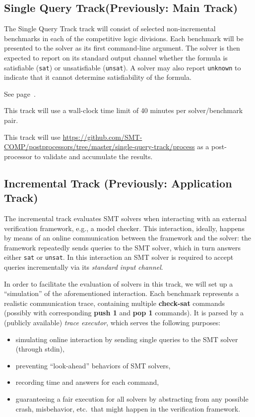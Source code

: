 \documentclass[12pt]{article}
\newcommand{\akey}[1]{\textbf{#1}\xspace}
\newcommand{\maintrack}{Single Query Track\xspace}
\begin{document}
\subsection{\maintrack (Previously: Main Track)}
\label{sec:exec:single}

The \maintrack track will consist of selected non-incremental benchmarks in
each of the competitive logic divisions.  Each benchmark will be presented to
the solver as its first command-line argument.  The solver is then expected to
report on its standard output channel whether the formula is satisfiable
(\texttt{sat}) or unsatisfiable (\texttt{unsat}).  A solver may also report
\texttt{unknown} to indicate that it cannot determine satisfiability of the
formula.

 See page~\pageref{benchmark-selection}.

This track will use a wall-clock time limit of 40 minutes per solver/benchmark
pair.

This track will use
{\url{https://github.com/SMT-COMP/postprocessors/tree/master/single-query-track/process}}
as a post-processor
to validate and accumulate the results.

\subsection{Incremental Track (Previously: Application Track)}
\label{sec:exec:app}

The incremental track evaluates SMT solvers when interacting with an
external verification framework, e.g., a model checker. This
interaction, ideally, happens by means of an online communication
between the framework and the solver: the framework repeatedly sends
queries to the SMT solver, which in turn answers either \texttt{sat}
or \texttt{unsat}.  In this interaction an SMT solver is required to
accept queries incrementally via its \emph{standard input channel}.

In order to facilitate the evaluation of solvers in this track, we will set up
a ``simulation'' of the aforementioned interaction.  Each benchmark represents
a realistic communication trace, containing multiple \akey{check-sat} commands
(possibly with corresponding \akey{push 1} and \akey{pop 1} commands). It is
parsed by a (publicly available) \emph{trace executor},
which serves the following purposes:

\begin{itemize}
  \item simulating online interaction by sending single queries to the SMT
    solver (through stdin),
  \item preventing ``look-ahead'' behaviors of SMT solvers,
  \item recording time and answers for each command,
  \item guaranteeing a fair execution for all solvers by abstracting
  from any possible crash, misbehavior, etc.\ that might happen in the
  verification framework.
\end{itemize}
\end{document}
